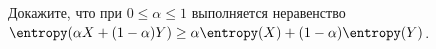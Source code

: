 Докажите, что при $0 \le \alpha \le 1$ выполняется неравенство
$\entropy(\alpha X + (1 - \alpha)Y) \ge \alpha \entropy(X) + (1 - \alpha) \entropy(Y)$.
